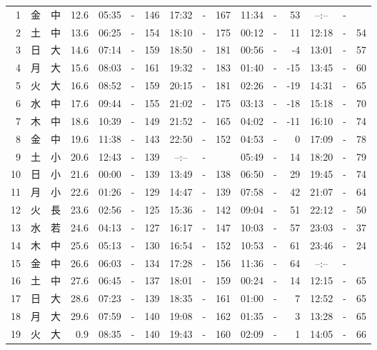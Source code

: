 \documentclass[12pt.a4j]{jsarticle}
\begin{document}
\begin{center}
\begin{table}[ht]
\begin{tabular}{|rc|cr|ccrccr|ccrccr|}
 \hline
 1 & 金 & 中 & 12.6 &  05:35 &-& 146  &  17:32 &-& 167  &   11:34 &-&  53  &   --:-- &-&     \\
 2 & 土 & 中 & 13.6 &  06:25 &-& 154  &  18:10 &-& 175  &   00:12 &-&  11  &   12:18 &-&  54  \\
 3 & 日 & 大 & 14.6 &  07:14 &-& 159  &  18:50 &-& 181  &   00:56 &-&  -4  &   13:01 &-&  57  \\
 4 & 月 & 大 & 15.6 &  08:03 &-& 161  &  19:32 &-& 183  &   01:40 &-& -15  &   13:45 &-&  60  \\
 5 & 火 & 大 & 16.6 &  08:52 &-& 159  &  20:15 &-& 181  &   02:26 &-& -19  &   14:31 &-&  65  \\
 6 & 水 & 中 & 17.6 &  09:44 &-& 155  &  21:02 &-& 175  &   03:13 &-& -18  &   15:18 &-&  70  \\
 7 & 木 & 中 & 18.6 &  10:39 &-& 149  &  21:52 &-& 165  &   04:02 &-& -11  &   16:10 &-&  74  \\
 8 & 金 & 中 & 19.6 &  11:38 &-& 143  &  22:50 &-& 152  &   04:53 &-&   0  &   17:09 &-&  78  \\
 9 & 土 & 小 & 20.6 &  12:43 &-& 139  &  --:-- &-&     &   05:49 &-&  14  &   18:20 &-&  79  \\
10 & 日 & 小 & 21.6 &  00:00 &-& 139  &  13:49 &-& 138  &   06:50 &-&  29  &   19:45 &-&  74  \\
11 & 月 & 小 & 22.6 &  01:26 &-& 129  &  14:47 &-& 139  &   07:58 &-&  42  &   21:07 &-&  64  \\
12 & 火 & 長 & 23.6 &  02:56 &-& 125  &  15:36 &-& 142  &   09:04 &-&  51  &   22:12 &-&  50  \\
13 & 水 & 若 & 24.6 &  04:13 &-& 127  &  16:17 &-& 147  &   10:03 &-&  57  &   23:03 &-&  37  \\
14 & 木 & 中 & 25.6 &  05:13 &-& 130  &  16:54 &-& 152  &   10:53 &-&  61  &   23:46 &-&  24  \\
15 & 金 & 中 & 26.6 &  06:03 &-& 134  &  17:28 &-& 156  &   11:36 &-&  64  &   --:-- &-&     \\
16 & 土 & 中 & 27.6 &  06:45 &-& 137  &  18:01 &-& 159  &   00:24 &-&  14  &   12:15 &-&  65  \\
17 & 日 & 大 & 28.6 &  07:23 &-& 139  &  18:35 &-& 161  &   01:00 &-&   7  &   12:52 &-&  65  \\
18 & 月 & 大 & 29.6 &  07:59 &-& 140  &  19:08 &-& 162  &   01:35 &-&   3  &   13:28 &-&  65  \\
19 & 火 & 大 &  0.9 &  08:35 &-& 140  &  19:43 &-& 160  &   02:09 &-&   1  &   14:05 &-&  66  \\

\end{tabular}
\end{table}
\end{center}
\end{document}
